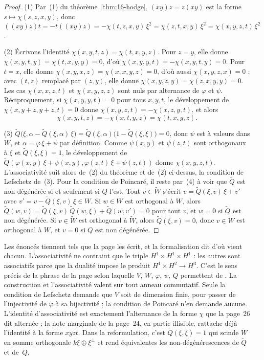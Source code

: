\begin{proof}
(1) Par~(1) du théorème~\ref{thm:16-hodge}, $(xy)z = z(xy)$ est la forme $s \mapsto \chi(s,z,x,y)$, donc $((xy)z)t = -t((xy)z) = -\chi(t,z,x,y)\,\xi^2 = \chi(z,t,x,y)\,\xi^2 = \chi(x,y,z,t)\,\xi^2$.

(2) Écrivons l'identité $\chi(x,y,t,z) = \chi(t,x,y,z)$. Pour $z = y$, elle donne $\chi(x,y,t,y) = \chi(t,x,y,y) = 0$, d'où $\chi(x,y,y,t) = -\chi(x,y,t,y) = 0$. Pour $t = x$, elle donne $\chi(x,y,x,z) = \chi(x,x,y,z) = 0$, d'où aussi $\chi(x,y,z,x) = 0$ ; avec $(t,z)$ remplacé par $(z,y)$, elle donne $\chi(x,y,z,y) = \chi(z,x,y,y) = 0$. Les cas $\chi(x,x,z,t)$ et $\chi(x,y,z,z)$ sont nuls par alternance de $\varphi$ et $\psi$. Réciproquement, si $\chi(x,y,y,t) = 0$ pour tous $x, y, t$, le développement de $\chi(x, y+z, y+z, t) = 0$ donne $\chi(x,y,z,t) = -\chi(x,z,y,t)$, et alors
\[
\chi(x,y,t,z) = -\chi(x,t,y,z) = \chi(t,x,y,z).
\]

(3) $\tilde Q\bigl(\xi, \alpha - \tilde Q(\xi,\alpha)\,\xi\bigr) = \tilde Q(\xi,\alpha)\bigl(1 - \tilde Q(\xi,\xi)\bigr) = 0$, donc $\psi$ est à valeurs dans $W$, et $\alpha = \varphi\,\xi + \psi$ par définition. Comme $\psi(x,y)$ et $\psi(z,t)$ sont orthogonaux à $\xi$ et $\tilde Q(\xi,\xi) = 1$, le développement de $\tilde Q(\varphi(x,y)\,\xi + \psi(x,y), \varphi(z,t)\,\xi + \psi(z,t))$ donne $\chi(x,y,z,t)$. L'associativité suit alors de~(2) du théorème et de~(2) ci-dessus, la condition de Lefschetz de~(3). Pour la condition de Poincaré, il reste par~(4) à voir que $\tilde Q$ est non dégénérée si et seulement si $Q$ l'est. Tout $v \in \tilde W$ s'écrit $v = \tilde Q(\xi,v)\,\xi + v'$ avec $v' = v - \tilde Q(\xi,v)\,\xi \in W$. Si $w \in W$ est orthogonal à $W$, alors $\tilde Q(w, v) = \tilde Q(\xi,v)\,\tilde Q(w,\xi) + \tilde Q(w, v') = 0$ pour tout $v$, et $w = 0$ si $\tilde Q$ est non dégénérée. Si $v \in \tilde W$ est orthogonal à $\tilde W$, alors $\tilde Q(\xi, v) = 0$, donc $v \in W$ est orthogonal à $W$, et $v = 0$ si $Q$ est non dégénérée.
\end{proof}

\begin{remarque}
Les énoncés tiennent tels que la page les écrit, et la formalisation dit d'où vient chacun. L'associativité ne contraint que le triple $H^1 \times H^1 \times H^1$ : les autres sont associatifs parce que la dualité impose le produit $H^1 \times H^2 \to H^3$. C'est le sens précis de la phrase de la page selon laquelle $V$, $W$, $\varphi$, $\psi$, $Q$ permettent de . La construction et l'associativité valent sur tout anneau commutatif. Seule la condition de Lefschetz demande que $V$ soit de dimension finie, pour passer de l'injectivité de $\tilde\varphi$ à sa bijectivité ; la condition de Poincaré n'en demande aucune. L'identité d'associativité est exactement l'alternance de la forme $\chi$ que la page~26 dit alternée ; la note marginale de la page~24, en partie illisible, rattache déjà l'identité à la forme $xyzt$. Dans la reformulation, c'est $\tilde Q(\xi,\xi) = 1$ qui scinde $\tilde W$ en somme orthogonale $k\xi \oplus \xi^{\perp}$ et rend équivalentes les non-dégénérescences de $\tilde Q$ et de~$Q$.
\end{remarque}

